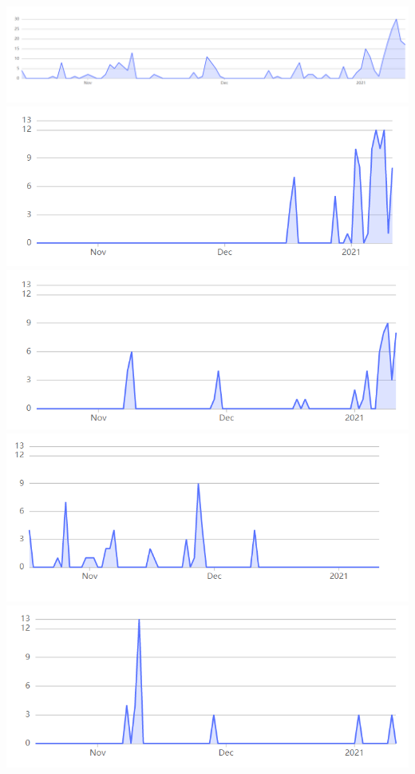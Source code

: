 		\includegraphics[scale=0.5]{slike/commit1.png}
		\includegraphics[scale=0.5]{slike/commit2.png}
		\includegraphics[scale=0.5]{slike/commit3.png}
		\includegraphics[scale=0.5]{slike/commit4.png}
		\includegraphics[scale=0.5]{slike/commit5.png}
